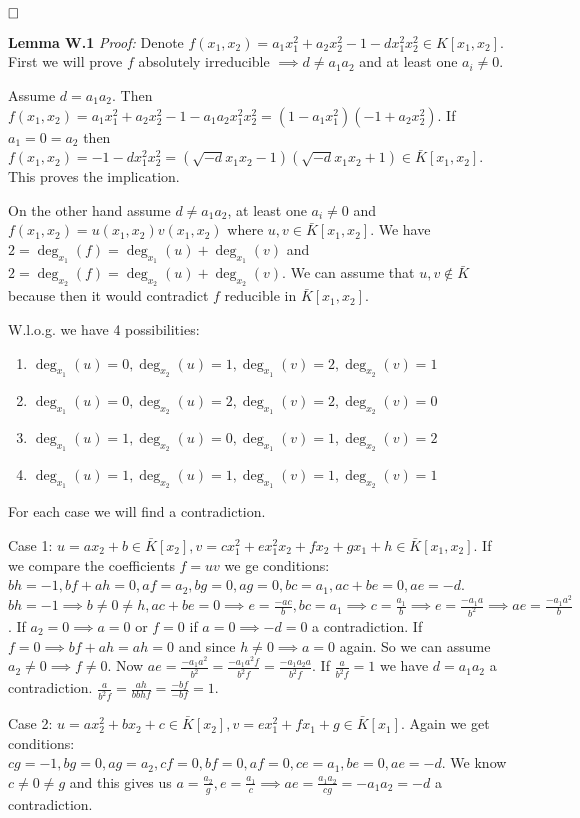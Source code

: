 \documentclass[12pt, a4paper]{article}
\newcommand{\qed}{\hfill\square}
\begin{document}
$\qed$

\textbf{Lemma W.1} \textit{Proof:}
Denote $f(x_1,x_2) = a_1x_1^2+a_2x_2^2-1-dx_1^2x_2^2 \in K[x_1, x_2]$. First we will prove $f$ absolutely irreducible $\implies d \neq a_1a_2$ and at least one $a_i \neq 0$.

Assume $d = a_1a_2$. Then $f(x_1,x_2) = a_1x_1^2+a_2x_2^2-1-a_1a_2x_1^2x_2^2 = (1-a_1x_1^2)(-1+a_2x_2^2)$. If $a_1 = 0 = a_2$ then $f(x_1,x_2) = -1-dx_1^2x_2^2 = (\sqrt{-d}x_1x_2-1)(\sqrt{-d}x_1x_2+1) \in \bar{K}[x_1, x_2]$. This proves the implication.

On the other hand assume $d \neq a_1a_2$, at least one $a_i \neq 0$ and $f(x_1,x_2) = u(x_1,x_2)v(x_1,x_2)$ where $u,v \in \bar{K}[x_1,x_2]$. We have $2 = \deg_{x_1}(f) = \deg_{x_1}(u)+\deg_{x_1}(v)$ and $2 = \deg_{x_2}(f) = \deg_{x_2}(u)+\deg_{x_2}(v)$. We can assume that $u,v \notin \bar{K}$ because then it would contradict $f$ reducible in $\bar{K}[x_1,x_2]$.

W.l.o.g. we have 4 possibilities:
\begin{enumerate}
    \item $\deg_{x_1}(u) = 0, \deg_{x_2}(u) = 1, \deg_{x_1}(v) = 2, \deg_{x_2}(v)=1$
    \item $\deg_{x_1}(u) = 0, \deg_{x_2}(u) = 2, \deg_{x_1}(v) = 2, \deg_{x_2}(v)=0$
    \item $\deg_{x_1}(u) = 1, \deg_{x_2}(u) = 0, \deg_{x_1}(v) = 1, \deg_{x_2}(v)=2$
    \item $\deg_{x_1}(u) = 1, \deg_{x_2}(u) = 1, \deg_{x_1}(v) = 1, \deg_{x_2}(v)=1$
\end{enumerate}
For each case we will find a contradiction.

Case 1: $u = ax_2+b \in \bar{K}[x_2], v = cx_1^2+ex_1^2x_2+fx_2+gx_1+h \in \bar{K}[x_1,x_2]$. If we compare the coefficients $f = uv$ we ge conditions: $bh=-1, bf+ah=0, af=a_2, bg=0, ag=0, bc=a_1, ac+be=0, ae=-d$.
$bh = -1 \implies b \neq 0 \neq h, ac+be= 0 \implies e = \frac{-ac}{b}, bc=a_1 \implies c = \frac{a_1}{b} \implies e = \frac{-a_1a}{b^2} \implies ae = \frac{-a_1a^2}{b}$. If $a_2 =0 \implies a=0$ or $f = 0$ if $a=0 \implies -d = 0$ a contradiction. If $f = 0 \implies bf+ah = ah = 0$ and since $h \neq 0 \implies a = 0$ again. So we can assume $a_2 \neq 0 \implies f \neq 0$. Now $ae = \frac{-a_1a^2}{b^2} = \frac{-a_1a^2f}{b^2f} = \frac{-a_1a_2a}{b^2f}$. If $\frac{a}{b^2f} = 1$ we have $d = a_1a_2$ a contradiction. $\frac{a}{b^2f} = \frac{ah}{bbhf} = \frac{-bf}{-bf} = 1$.

Case 2: $u = ax_2^2+bx_2+c \in \bar{K}[x_2], v = ex_1^2+fx_1+g \in \bar{K}[x_1]$. Again we get conditions: $cg=-1, bg=0, ag=a_2, cf=0,bf=0, af=0, ce=a_1, be=0, ae=-d$. We know $c \neq 0 \neq g$ and this gives us $a = \frac{a_2}{g}, e = \frac{a_1}{c} \implies ae = \frac{a_1a_2}{cg} = -a_1a_2 = -d$ a contradiction.
\end{document}
